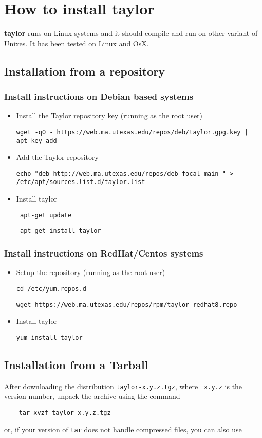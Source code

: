 \documentclass[10pt]{article}
\theoremstyle{remark}
\newcommand{\taylorname}{{\bf taylor}}
\begin{document}
\section{How to install \taylorname{}} \label{sec:install}
\taylorname{} runs on Linux systems and it should compile and run on
other variant of Unixes. It has been tested on Linux and OsX.

\subsection{Installation from a repository}
\subsubsection*{Install instructions on Debian based systems}
\begin{itemize}
    \item {Install the Taylor repository key (running as the root
      user)
    
    
    \tt{wget -qO - https://web.ma.utexas.edu/repos/deb/taylor.gpg.key
      | apt-key add - }}
    \item{Add the Taylor repository 

    
    \tt{echo "deb http://web.ma.utexas.edu/repos/deb focal main " >
      /etc/apt/sources.list.d/taylor.list }}
    \item{Install taylor 

    
    \tt{ apt-get update} 

    
    \tt{ apt-get install taylor}}
\end{itemize}

\subsubsection*{Install instructions on RedHat/Centos systems}
\begin{itemize}
    \item {Setup the repository (running as the root user)
    
    \tt{cd /etc/yum.repos.d}

    \tt{wget https://web.ma.utexas.edu/repos/rpm/taylor-redhat8.repo}
    }
    \item{Install taylor
    
    \tt{yum install taylor}
    
    }
\end{itemize}

\subsection{Installation from a Tarball}
After downloading the distribution {\tt taylor-x.y.z.tgz}, where {\tt
  x.y.z} is the version number, unpack the archive using the command
\begin{verbatim}
    tar xvzf taylor-x.y.z.tgz
\end{verbatim}
\noindent
or, if your version of {\tt tar} does not handle compressed files, you
can also use
\end{document}
